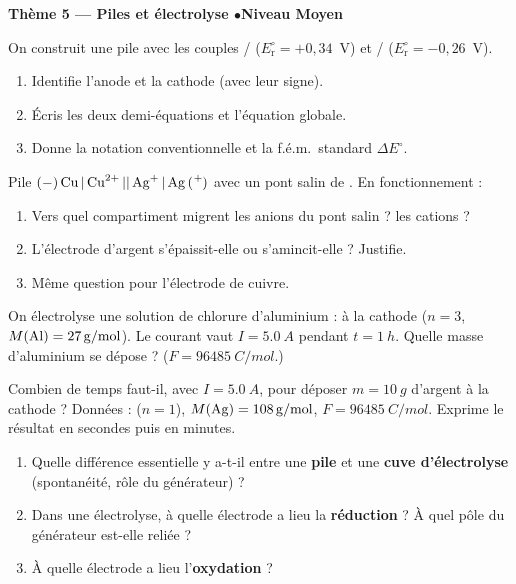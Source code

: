 \documentclass[11pt,a4paper]{article}
\begin{document}
\begin{center}\color{primarydark}\large\bfseries Thème 5 — Piles et électrolyse \quad$\bullet$\quad Niveau Moyen\end{center}

\begin{exo}
On construit une pile avec les couples / ($E_{\mathrm{r}}^{\circ}=+0{,}34$~V) et
/ ($E_{\mathrm{r}}^{\circ}=-0{,}26$~V).
\begin{enumerate}[label=\alph*)]
  \item Identifie l'anode et la cathode (avec leur signe).
  \item Écris les deux demi-équations et l'équation globale.
  \item Donne la notation conventionnelle et la f.é.m.\ standard $\Delta E^{\circ}$.
\end{enumerate}
\end{exo}

\begin{exo}
Pile $\ce{(-) Cu | Cu^{2+} || Ag+ | Ag (+)}$ avec un pont salin de . En fonctionnement :
\begin{enumerate}[label=\alph*)]
  \item Vers quel compartiment migrent les anions  du pont salin ? les cations  ?
  \item L'électrode d'argent s'épaissit-elle ou s'amincit-elle ? Justifie.
  \item Même question pour l'électrode de cuivre.
\end{enumerate}
\end{exo}

\begin{exo}
On électrolyse une solution de chlorure d'aluminium : à la cathode
 ($n=3$, $M(\ce{Al})=\qty{27}{g\per mol}$). Le courant vaut
$I=\qty{5.0}{A}$ pendant $t=\qty{1}{h}$. Quelle masse d'aluminium se dépose ?
($F=\qty{96485}{C\per mol}$.)
\end{exo}

\begin{exo}
Combien de temps faut-il, avec $I=\qty{5.0}{A}$, pour déposer $m=\qty{10}{g}$ d'argent à la cathode ?
Données :  ($n=1$), $M(\ce{Ag})=\qty{108}{g\per mol}$,
$F=\qty{96485}{C\per mol}$. Exprime le résultat en secondes puis en minutes.
\end{exo}

\begin{exo}
\begin{enumerate}[label=\alph*)]
  \item Quelle différence essentielle y a-t-il entre une \textbf{pile} et une \textbf{cuve
        d'électrolyse} (spontanéité, rôle du générateur) ?
  \item Dans une électrolyse, à quelle électrode a lieu la \textbf{réduction} ? À quel pôle du
        générateur est-elle reliée ?
  \item À quelle électrode a lieu l'\textbf{oxydation} ?
\end{enumerate}
\end{exo}
\end{document}
